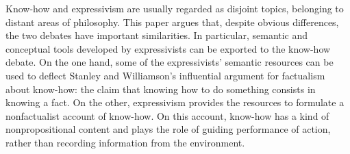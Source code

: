 Know-how and expressivism are usually regarded as disjoint topics, belonging to distant areas of philosophy. This paper argues that, despite obvious differences, the two debates have important similarities. In particular, semantic and conceptual tools developed by expressivists can be exported to the know-how debate. On the one hand, some of the expressivists' semantic resources can be used to deflect Stanley and Williamson's influential argument for factualism about know-how: the claim that knowing how to do something consists in knowing a fact. On the other, expressivism provides the resources to formulate a nonfactualist account of know-how. On this account, know-how has a kind of nonpropositional content and plays the role of guiding performance of action, rather than recording information from the environment.
\endinput